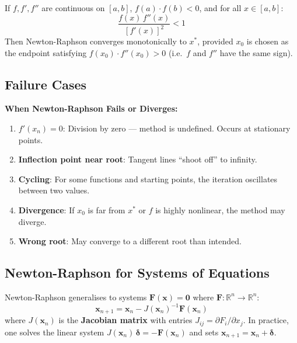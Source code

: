 \documentclass[12pt]{article}
\begin{document}
\begin{thmbox}
If $f,f',f''$ are continuous on $[a,b]$, $f(a)\cdot f(b)<0$, and for all $x\in[a,b]$:
\[
  \frac{f(x)\,f''(x)}{[f'(x)]^2} < 1
\]
Then Newton-Raphson converges monotonically to $x^*$, provided $x_0$ is chosen as the endpoint satisfying $f(x_0)\cdot f''(x_0)>0$ (i.e.\ $f$ and $f''$ have the same sign).
\end{thmbox}

\bigskip

\subsection*{Failure Cases}

\begin{keybox}
\textbf{When Newton-Raphson Fails or Diverges:}
\begin{enumerate}[noitemsep]
  \item \textbf{$f'(x_n) = 0$}: Division by zero — method is undefined. Occurs at stationary points.
  \item \textbf{Inflection point near root}: Tangent lines ``shoot off'' to infinity.
  \item \textbf{Cycling}: For some functions and starting points, the iteration oscillates between two values.
  \item \textbf{Divergence}: If $x_0$ is far from $x^*$ or $f$ is highly nonlinear, the method may diverge.
  \item \textbf{Wrong root}: May converge to a different root than intended.
\end{enumerate}
\end{keybox}

\bigskip

\subsection*{Newton-Raphson for Systems of Equations}

Newton-Raphson generalises to systems $\mathbf{F}(\mathbf{x})=\mathbf{0}$ where $\mathbf{F}:\mathbb{R}^n\to\mathbb{R}^n$:
\[
  \mathbf{x}_{n+1} = \mathbf{x}_n - J(\mathbf{x}_n)^{-1}\mathbf{F}(\mathbf{x}_n)
\]
where $J(\mathbf{x}_n)$ is the \textbf{Jacobian matrix} with entries $J_{ij}=\partial F_i/\partial x_j$. In practice, one solves the linear system $J(\mathbf{x}_n)\,\boldsymbol{\delta}=-\mathbf{F}(\mathbf{x}_n)$ and sets $\mathbf{x}_{n+1}=\mathbf{x}_n+\boldsymbol{\delta}$.
\end{document}
